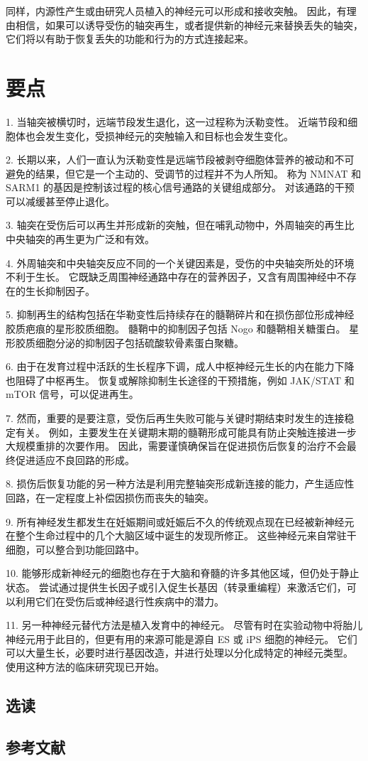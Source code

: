 同样，内源性产生或由研究人员植入的神经元可以形成和接收突触。 因此，有理由相信，如果可以诱导受伤的轴突再生，或者提供新的神经元来替换丢失的轴突，它们将以有助于恢复丢失的功能和行为的方式连接起来。

\section{要点}

1. 当轴突被横切时，远端节段发生退化，这一过程称为沃勒变性。 近端节段和细胞体也会发生变化，受损神经元的突触输入和目标也会发生变化。 

2. 长期以来，人们一直认为沃勒变性是远端节段被剥夺细胞体营养的被动和不可避免的结果，但它是一个主动的、受调节的过程并不为人所知。 称为 NMNAT 和 SARM1 的基因是控制该过程的核心信号通路的关键组成部分。 对该通路的干预可以减缓甚至停止退化。 

3. 轴突在受伤后可以再生并形成新的突触，但在哺乳动物中，外周轴突的再生比中央轴突的再生更为广泛和有效。 

4. 外周轴突和中央轴突反应不同的一个关键因素是，受伤的中央轴突所处的环境不利于生长。 它既缺乏周围神经通路中存在的营养因子，又含有周围神经中不存在的生长抑制因子。 

5. 抑制再生的结构包括在华勒变性后持续存在的髓鞘碎片和在损伤部位形成神经胶质疤痕的星形胶质细胞。 髓鞘中的抑制因子包括 Nogo 和髓鞘相关糖蛋白。 星形胶质细胞分泌的抑制因子包括硫酸软骨素蛋白聚糖。 

6. 由于在发育过程中活跃的生长程序下调，成人中枢神经元生长的内在能力下降也阻碍了中枢再生。 恢复或解除抑制生长途径的干预措施，例如 JAK/STAT 和 mTOR 信号，可以促进再生。 

7. 然而，重要的是要注意，受伤后再生失败可能与关键时期结束时发生的连接稳定有关。 例如，主要发生在关键期末期的髓鞘形成可能具有防止突触连接进一步大规模重排的次要作用。 因此，需要谨慎确保旨在促进损伤后恢复的治疗不会最终促进适应不良回路的形成。 

8. 损伤后恢复功能的另一种方法是利用完整轴突形成新连接的能力，产生适应性回路，在一定程度上补偿因损伤而丧失的轴突。 

9. 所有神经发生都发生在妊娠期间或妊娠后不久的传统观点现在已经被新神经元在整个生命过程中的几个大脑区域中诞生的发现所修正。 这些神经元来自常驻干细胞，可以整合到功能回路中。 

10. 能够形成新神经元的细胞也存在于大脑和脊髓的许多其他区域，但仍处于静止状态。 尝试通过提供生长因子或引入促生长基因（转录重编程）来激活它们，可以利用它们在受伤后或神经退行性疾病中的潜力。 

11. 另一种神经元替代方法是植入发育中的神经元。 尽管有时在实验动物中将胎儿神经元用于此目的，但更有用的来源可能是源自 ES 或 iPS 细胞的神经元。 它们可以大量生长，必要时进行基因改造，并进行处理以分化成特定的神经元类型。 使用这种方法的临床研究现已开始。
\subsection{选读}
\subsection{参考文献}

